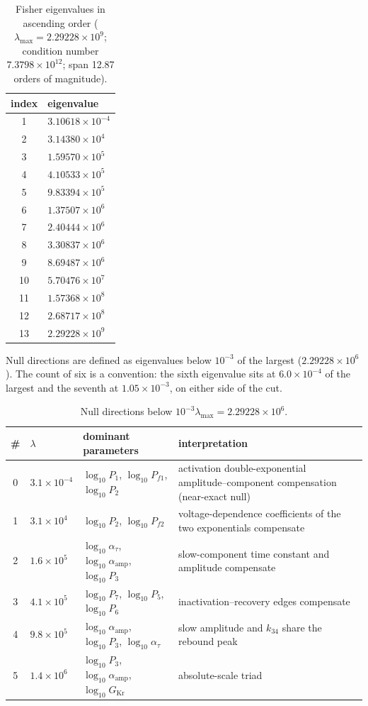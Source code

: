 \documentclass[11pt,a4paper]{article}
\begin{document}
\begin{table}[htbp]\centering\small
\caption{Fisher eigenvalues in ascending order ($\lambda_{\max}=2.29228\times10^{9}$;
condition number $7.3798\times10^{12}$; span 12.87 orders of magnitude).}
\begin{tabular}{@{}cl@{}}
\toprule
index & eigenvalue \\
\midrule
1 & $3.10618\times10^{-4}$ \\
2 & $3.14380\times10^{4}$ \\
3 & $1.59570\times10^{5}$ \\
4 & $4.10533\times10^{5}$ \\
5 & $9.83394\times10^{5}$ \\
6 & $1.37507\times10^{6}$ \\
7 & $2.40444\times10^{6}$ \\
8 & $3.30837\times10^{6}$ \\
9 & $8.69487\times10^{6}$ \\
10 & $5.70476\times10^{7}$ \\
11 & $1.57368\times10^{8}$ \\
12 & $2.68717\times10^{8}$ \\
13 & $2.29228\times10^{9}$ \\
\bottomrule
\end{tabular}
\end{table}

Null directions are defined as eigenvalues below $10^{-3}$ of the largest
($2.29228\times10^{6}$). The count of six is a convention: the sixth eigenvalue
sits at $6.0\times10^{-4}$ of the largest and the seventh at
$1.05\times10^{-3}$, on either side of the cut.

\begin{table}[htbp]\centering\small
\caption{Null directions below $10^{-3}\lambda_{\max}=2.29228\times10^{6}$.}
\begin{tabular}{@{}clp{4.2cm}p{5.2cm}@{}}
\toprule
\# & $\lambda$ & dominant parameters & interpretation \\
\midrule
0 & $3.1\times10^{-4}$ & $\log_{10}P_1$, $\log_{10}P_{f1}$, $\log_{10}P_2$ & activation double-exponential amplitude--component compensation (near-exact null) \\
1 & $3.1\times10^{4}$ & $\log_{10}P_2$, $\log_{10}P_{f2}$ & voltage-dependence coefficients of the two exponentials compensate \\
2 & $1.6\times10^{5}$ & $\log_{10}\alpha_\tau$, $\log_{10}\alpha_{\mathrm{amp}}$, $\log_{10}P_3$ & slow-component time constant and amplitude compensate \\
3 & $4.1\times10^{5}$ & $\log_{10}P_7$, $\log_{10}P_5$, $\log_{10}P_6$ & inactivation--recovery edges compensate \\
4 & $9.8\times10^{5}$ & $\log_{10}\alpha_{\mathrm{amp}}$, $\log_{10}P_3$, $\log_{10}\alpha_\tau$ & slow amplitude and $k_{34}$ share the rebound peak \\
5 & $1.4\times10^{6}$ & $\log_{10}P_3$, $\log_{10}\alpha_{\mathrm{amp}}$, $\log_{10}G_{\mathrm{Kr}}$ & absolute-scale triad \\
\bottomrule
\end{tabular}
\end{table}
\end{document}
